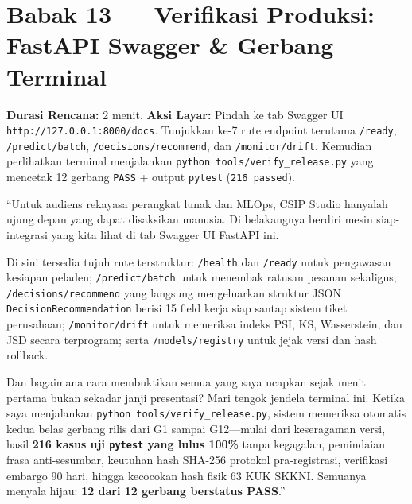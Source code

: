 \documentclass[11pt,a4paper,oneside]{book}
\newcommand{\code}[1]{{\small\nolinkurl{#1}}}
\begin{document}
\section{Babak 13 --- Verifikasi Produksi: FastAPI Swagger \& Gerbang Terminal}

\begin{stagebox}
\textbf{Durasi Rencana:} 2 menit. \quad \textbf{Aksi Layar:} Pindah ke tab Swagger UI \code{http://127.0.0.1:8000/docs}. Tunjukkan ke-7 rute endpoint terutama \code{/ready}, \code{/predict/batch}, \code{/decisions/recommend}, dan \code{/monitor/drift}. Kemudian perlihatkan terminal menjalankan \code{python tools/verify_release.py} yang mencetak 12 gerbang \code{PASS} + output \code{pytest} (\code{216 passed}).
\end{stagebox}

\begin{scriptbox}
``Untuk audiens rekayasa perangkat lunak dan MLOps, CSIP Studio hanyalah ujung depan yang dapat disaksikan manusia. Di belakangnya berdiri mesin siap-integrasi yang kita lihat di tab Swagger UI FastAPI ini.

Di sini tersedia tujuh rute terstruktur: \code{/health} dan \code{/ready} untuk pengawasan kesiapan peladen; \code{/predict/batch} untuk menembak ratusan pesanan sekaligus; \code{/decisions/recommend} yang langsung mengeluarkan struktur JSON \code{DecisionRecommendation} berisi 15 field kerja siap santap sistem tiket perusahaan; \code{/monitor/drift} untuk memeriksa indeks PSI, KS, Wasserstein, dan JSD secara terprogram; serta \code{/models/registry} untuk jejak versi dan hash rollback.

Dan bagaimana cara membuktikan semua yang saya ucapkan sejak menit pertama bukan sekadar janji presentasi? Mari tengok jendela terminal ini. Ketika saya menjalankan \code{python tools/verify_release.py}, sistem memeriksa otomatis kedua belas gerbang rilis dari G1 sampai G12---mulai dari keseragaman versi, hasil \textbf{216 kasus uji \code{pytest} yang lulus 100\%} tanpa kegagalan, pemindaian frasa anti-sesumbar, keutuhan hash SHA-256 protokol pra-registrasi, verifikasi embargo 90 hari, hingga kecocokan hash fisik 63 KUK SKKNI. Semuanya menyala hijau: \textbf{12 dari 12 gerbang berstatus PASS}.''
\end{scriptbox}

\end{document}
